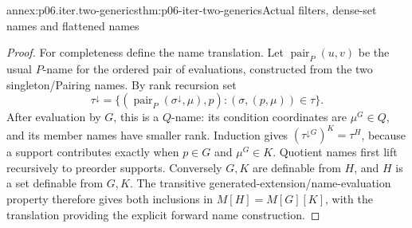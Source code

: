 \begin{annexitem}{annex:p06.iter.two-generics}{thm:p06-iter-two-generics}{Actual filters, dense-set names and flattened names}
\begin{proof}
For completeness define the name translation. Let
\(\operatorname{pair}_P(u,v)\) be the usual \(P\)-name for the ordered
pair of evaluations, constructed from the two singleton/Pairing names.
By rank recursion set
\[
 \tau^\downarrow=
 \{(\operatorname{pair}_P(\sigma^\downarrow,\mu),p):
                         (\sigma,(p,\mu))\in\tau\}.
\]
After evaluation by \(G\), this is a \(Q\)-name: its condition
coordinates are \(\mu^G\in Q\), and its member names have smaller
rank. Induction gives
\((\tau^\downarrow{}^G)^K=\tau^H\), because a support contributes
exactly when \(p\in G\) and \(\mu^G\in K\). Quotient names first
lift recursively to preorder supports. Conversely \(G,K\) are definable
from \(H\), and \(H\) is a set definable from \(G,K\). The transitive
generated-extension/name-evaluation property therefore gives both
inclusions in \(M[H]=M[G][K]\), with the translation providing the
explicit forward name construction.
\end{proof}
\end{annexitem}

